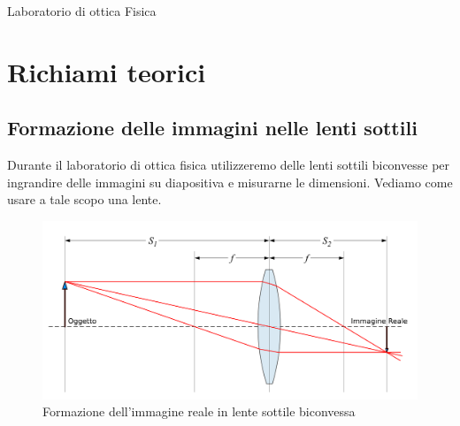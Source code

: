 \documentclass[a4paper,10pt,oneside]{article}
\begin{document}
\begin{center}
{\huge Laboratorio di ottica Fisica}
\end{center}

\begin{abstract}
 In questo laboratorio studieremo i fenomeni di interferenza e diffrazione che evidenziano la natura ondulatoria della luce. Ci soffermeremo su gli esperimenti di interferenza per divisione del fronte d'onda (Young, Fresnel, Loyd etc.) e di diffrazione da ostruzioni circolari e rettangolari. 
\end{abstract}


\vspace{1.5cm}


\section{Richiami teorici}



\subsection{Formazione delle immagini nelle lenti sottili}

Durante il laboratorio di ottica fisica utilizzeremo delle lenti sottili biconvesse per ingrandire delle immagini su diapositiva e misurarne le dimensioni. Vediamo come usare a tale scopo una lente.

\begin{figure}[H]
 \centering
 \includegraphics[width=\textwidth]{./Immagini/Lens3.png}
 \caption{Formazione dell'immagine reale in lente sottile biconvessa}
 \label{fig:lenti_1}
\end{figure}
\end{document}
